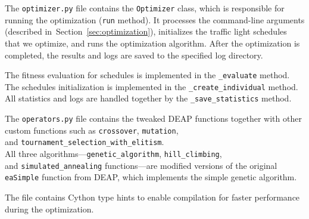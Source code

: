 \bigskip

The \verb|optimizer.py| file contains the \verb|Optimizer| class, which is responsible for running the optimization (\verb|run| method). It processes the command-line arguments (described in~Section~\ref{sec:optimization}), initializes the traffic light schedules that we optimize, and runs the optimization algorithm. After the optimization is completed, the results and logs are saved to the specified log directory.

The fitness evaluation for schedules is implemented in the \verb|_evaluate| method.
The schedules initialization is implemented in the \verb|_create_individual| method.
All statistics and logs are handled together by the \verb|_save_statistics| method.

\bigskip

The \verb|operators.py| file contains the tweaked DEAP functions together with other custom functions such as \verb|crossover|, \verb|mutation|, \\
and \verb|tournament_selection_with_elitism|. \\
All three algorithms---\verb|genetic_algorithm|, \verb|hill_climbing|, \\
and \verb|simulated_annealing| functions---are modified versions of the original \verb|eaSimple| function from DEAP, which implements the simple genetic algorithm.

The file contains Cython type hints to enable compilation for faster performance during the optimization.
